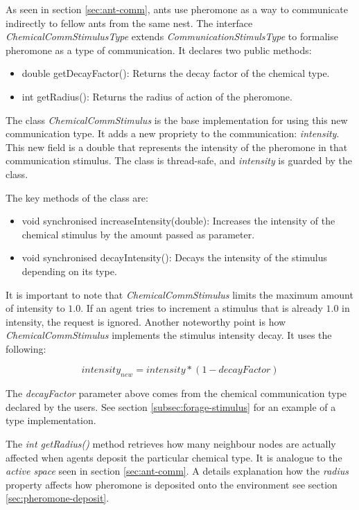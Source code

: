 As seen in section \ref{sec:ant-comm}, ants use pheromone as a way to communicate indirectly to fellow ants from the same nest. The interface \emph{ChemicalCommStimulusType} extends \emph{CommunicationStimulsType} to formalise pheromone as a type of communication. It declares two public methods:

\begin{itemize}
  \item double getDecayFactor(): Returns the decay factor of the chemical type. 
  \item int getRadius(): Returns the radius of action of the pheromone.
\end{itemize}

The class \emph{ChemicalCommStimulus} is the base implementation for using this new communication type. It adds a new propriety to the communication: \emph{intensity}. This new field is a double that represents the intensity of the pheromone in that communication stimulus. The class is thread-safe, and \emph{intensity} is guarded by the class.

The key methods of the class are:

\begin{itemize}
  \item void synchronised increaseIntensity(double): Increases the intensity of the chemical stimulus by the amount passed as parameter.
  
  \item void synchronised decayIntensity(): Decays the intensity of the stimulus depending on its type.
\end{itemize}

It is important to note that \emph{ChemicalCommStimulus} limits the maximum amount of intensity to $1.0$. If an agent tries to increment a stimulus that is already $1.0$ in intensity, the request is ignored.
Another noteworthy point is how \emph{ChemicalCommStimulus} implements the stimulus intensity decay. It uses the following:

\begin{equation}
intensity_{new} = intensity * (1 - decayFactor)
\end{equation}

The \emph{decayFactor} parameter above comes from the chemical communication type declared by the users. See section \ref{subsec:forage-stimulus} for an example of a type implementation.

The \emph{int getRadius()} method retrieves how many neighbour nodes are actually affected when agents deposit the particular chemical type. It is analogue to the \emph{active space} seen in section \ref{sec:ant-comm}. A details explanation how the \emph{radius} property affects how pheromone is deposited onto the environment see section \ref{sec:pheromone-deposit}.

